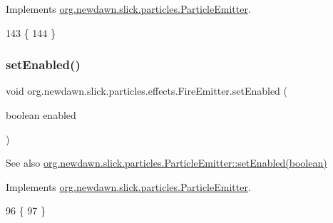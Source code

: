 Implements \mbox{\hyperlink{interfaceorg_1_1newdawn_1_1slick_1_1particles_1_1_particle_emitter_a1120925a31c61fc95dc38eca9b01b9ef}{org.\+newdawn.\+slick.\+particles.\+Particle\+Emitter}}.


\begin{DoxyCode}
143                              \{
144     \}
\end{DoxyCode}
\mbox{\label{classorg_1_1newdawn_1_1slick_1_1particles_1_1effects_1_1_fire_emitter_a9558a088fe132a0ea0bc5fd74585b9a1}} 
\subsubsection{\texorpdfstring{set\+Enabled()}{setEnabled()}}
{\footnotesize\ttfamily void org.\+newdawn.\+slick.\+particles.\+effects.\+Fire\+Emitter.\+set\+Enabled (\begin{DoxyParamCaption}\item[{boolean}]{enabled }\end{DoxyParamCaption})\hspace{0.3cm}{\ttfamily [inline]}}

\begin{DoxySeeAlso}{See also}
\mbox{\hyperlink{interfaceorg_1_1newdawn_1_1slick_1_1particles_1_1_particle_emitter_a0db4bbc7bb9b5cc2b828993e065db057}{org.\+newdawn.\+slick.\+particles.\+Particle\+Emitter\+::set\+Enabled(boolean)}} 
\end{DoxySeeAlso}


Implements \mbox{\hyperlink{interfaceorg_1_1newdawn_1_1slick_1_1particles_1_1_particle_emitter_a0db4bbc7bb9b5cc2b828993e065db057}{org.\+newdawn.\+slick.\+particles.\+Particle\+Emitter}}.


\begin{DoxyCode}
96                                             \{
97     \}
\end{DoxyCode}
\mbox{\label{classorg_1_1newdawn_1_1slick_1_1particles_1_1effects_1_1_fire_emitter_a377a97e3799473ee2e2f026ac4530ad4}} 
